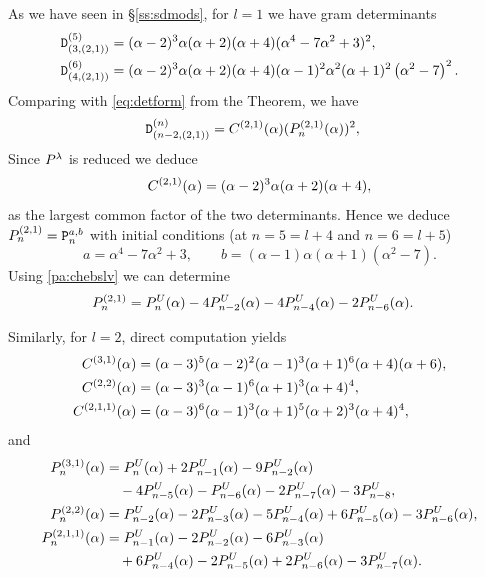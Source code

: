 \mdef \label{pa:21dets}
 As we have seen in \S\ref{ss:sdmods}, for $l=1$ we have gram determinants 
\begin{align*}
    {\mathtt D}^{(5)}_{(3,(2,1) )}&= (\alpha -2)^3 \alpha  (\alpha +2) (\alpha +4)(\alpha ^4-7 \alpha ^2+3)^2,\\
    {\mathtt D}^{(6)}_{(4,(2,1) )}&= (\alpha -2)^3 \alpha  (\alpha +2) (\alpha +4)(\alpha -1)^2 \alpha^2(\alpha +1)^2 \left(\alpha ^2-7\right)^2.
\end{align*} 
Comparing with \eqref{eq:detform} from the Theorem,  
we have
\[
{\mathtt D}^{(n)}_{(n-2,(2,1) )}= C^{(2,1)}(\alpha) (P^{(2,1)}_n(\alpha))^2, \quad 
\]
Since $P^\lambda$ is reduced we deduce
\[
C^{(2,1)}(\alpha)= (\alpha -2)^3 \alpha  (\alpha +2) (\alpha +4),  
\]
as the largest common factor of the two determinants. Hence we deduce
$P^{(2,1)}_n={\mathtt P}^{a,b}_n$ with initial conditions (at $n=5=l+4$ and $n=6=l+5$)
\[
a=\alpha ^4-7 \alpha ^2+3, \qquad b=(\alpha -1) \alpha  (\alpha +1) \left(\alpha ^2-7\right).
\]
Using \ref{pa:chebslv} we can determine
\begin{align*}
    P^{(2,1)}_n&=P^U_{n}(\alpha)-4P^U_{n-2}(\alpha)-4P^U_{n-4}(\alpha)-2 P^U_{n-6}(\alpha).
\end{align*}

\mdef 
Similarly, for $l=2$, direct computation  yields
\begin{align*}
    C^{(3,1)}(\alpha)&=(\alpha -3)^5 (\alpha -2)^2 (\alpha -1)^3 (\alpha +1)^6 (\alpha +4) (\alpha +6),\\
    C^{(2,2)}(\alpha)&=(\alpha -3)^3 (\alpha -1)^6 (\alpha +1)^3 (\alpha +4)^4,\\
    C^{(2,1,1)}(\alpha)&=(\alpha -3)^6 (\alpha -1)^3 (\alpha +1)^5 (\alpha +2)^3 (\alpha +4)^4,\end{align*}
and
\begin{align*}
    P^{(3,1)}_{n}(\alpha)&=P^U_{n}(\alpha)+2 P^U_{n-1}(\alpha)-9 P^U_{n-2}(\alpha)\\
    &\quad-4 P^U_{n-5}(\alpha)- P^U_{n-6}(\alpha)-2 P^U_{n-7}(\alpha)-3 P^U_{n-8},\\
    P^{(2,2)}_{n}(\alpha)&=P^U_{n-2}(\alpha)-2 P^U_{n-3}(\alpha)-5 P^U_{n-4}(\alpha)+6 P^U_{n-5}(\alpha)-3 P^U_{n-6}(\alpha), \\
    P^{(2,1,1)}_{n}(\alpha)&=P^U_{n-1}(\alpha)-2 P^U_{n-2}(\alpha)-6 P^U_{n-3}(\alpha)\\
    &\quad +6 P^U_{n-4}(\alpha) -2 P^U_{n-5}(\alpha)+2 P^U_{n-6}(\alpha)-3 P^U_{n-7}(\alpha).
\end{align*}

